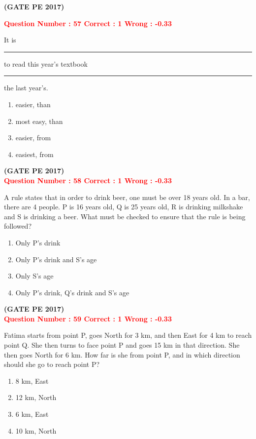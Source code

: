 \documentclass[12pt]{article}
\begin{document}
{\hfill\textbf{(GATE PE 2017)}\\[0.6cm]

\newpage


\textcolor{red}{\textbf{Question Number : 57 \hfill Correct : 1  Wrong : -0.33}}


It is \rule{2cm}{0.4pt} to read this year’s textbook \rule{2cm}{0.4pt} the last year’s.

\begin{enumerate}[label=(\Alph*)]
    \item easier, than
    \item most easy, than
    \item easier, from
    \item easiest, from
\end{enumerate}

\hfill\textbf{(GATE PE 2017)}\\[0.6cm]


\textcolor{red}{\textbf{Question Number : 58 \hfill Correct : 1  Wrong : -0.33}}


A rule states that in order to drink beer, one must be over 18 years old. In a bar, there are 4 people. P is 16 years old, Q is 25 years old, R is drinking milkshake and S is drinking a beer. What must be checked to ensure that the rule is being followed?

\begin{enumerate}[label=(\Alph*)]
    \item Only P’s drink
    \item Only P’s drink and S’s age
    \item Only S’s age
    \item Only P’s drink, Q’s drink and S’s age
\end{enumerate}

\hfill\textbf{(GATE PE 2017)}\\[0.6cm]

\textcolor{red}{\textbf{Question Number : 59 \hfill Correct : 1  Wrong : -0.33}}


Fatima starts from point P, goes North for 3 km, and then East for 4 km to reach point Q. She then turns to face point P and goes 15 km in that direction. She then goes North for 6 km. How far is she from point P, and in which direction should she go to reach point P?

\begin{enumerate}[label=(\Alph*)]
    \item 8 km, East
    \item 12 km, North
    \item 6 km, East
    \item 10 km, North
\end{enumerate}

}
\end{document}
